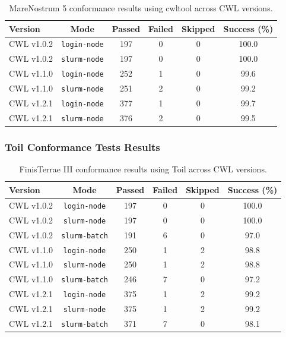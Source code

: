 \documentclass{article}
\begin{document}
\begin{table}[ht!]
\centering
\renewcommand{\arraystretch}{1.2}
\setlength{\tabcolsep}{6pt}
\begin{tabular}{|l|c|c|c|c|c|}
\hline
\rowcolor{lightgray!50}
\textbf{Version} & \textbf{Mode} & \textbf{Passed} & \textbf{Failed} & \textbf{Skipped} & \textbf{Success (\%)} \\
\hline
CWL v1.0.2 & \texttt{login-node} & 197 & 0 & 0 & 100.0 \\ \hline
CWL v1.0.2 & \texttt{slurm-node} & 197 & 0 & 0 & 100.0 \\ \hline
\hline
CWL v1.1.0 & \texttt{login-node} & 252 & 1 & 0 & 99.6 \\ \hline
CWL v1.1.0 & \texttt{slurm-node} & 251 & 2 & 0 & 99.2 \\ \hline
\hline
CWL v1.2.1 & \texttt{login-node} & 377 & 1 & 0 & 99.7 \\ \hline
CWL v1.2.1 & \texttt{slurm-node} & 376 & 2 & 0 & 99.5 \\ \hline
\hline
\end{tabular}
\caption{MareNostrum 5 conformance results using cwltool across CWL versions.}
\end{table}





\clearpage
\subsubsection*{Toil Conformance Tests Results}
\begin{table}[ht!]
\centering
\renewcommand{\arraystretch}{1.2}
\setlength{\tabcolsep}{6pt}
\begin{tabular}{|l|c|c|c|c|c|}
\hline
\rowcolor{lightgray!50}
\textbf{Version} & \textbf{Mode} & \textbf{Passed} & \textbf{Failed} & \textbf{Skipped} & \textbf{Success (\%)} \\
\hline
CWL v1.0.2 & \texttt{login-node} & 197 & 0 & 0 & 100.0 \\ \hline
CWL v1.0.2 & \texttt{slurm-node} & 197 & 0 & 0 & 100.0 \\ \hline
CWL v1.0.2 & \texttt{slurm-batch} & 191 & 6 & 0 & 97.0 \\ \hline
\hline
CWL v1.1.0 & \texttt{login-node} & 250 & 1 & 2 & 98.8 \\ \hline
CWL v1.1.0 & \texttt{slurm-node} & 250 & 1 & 2 & 98.8 \\ \hline
CWL v1.1.0 & \texttt{slurm-batch} & 246 & 7 & 0 & 97.2 \\ \hline
\hline
CWL v1.2.1 & \texttt{login-node} & 375 & 1 & 2 & 99.2 \\ \hline
CWL v1.2.1 & \texttt{slurm-node} & 375 & 1 & 2 & 99.2 \\ \hline
CWL v1.2.1 & \texttt{slurm-batch} & 371 & 7 & 0 & 98.1 \\ \hline
\hline
\end{tabular}
\caption{FinisTerrae III conformance results using Toil across CWL versions.}
\end{table}
\end{document}
